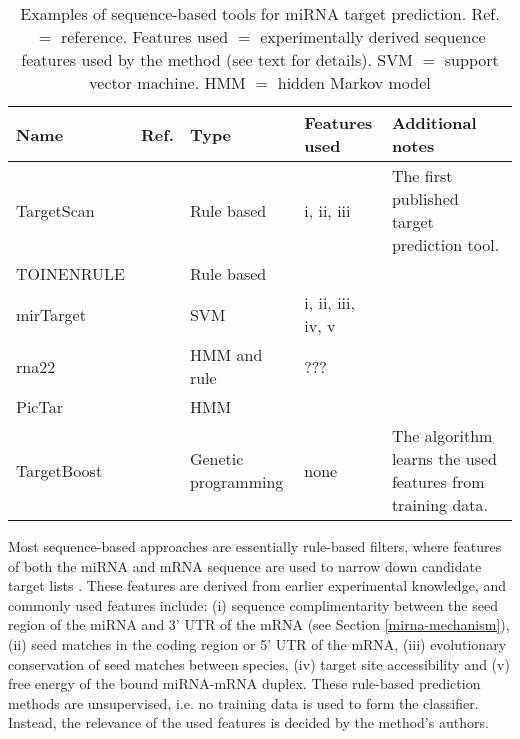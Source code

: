 \begin{table}
  \caption{Examples of sequence-based tools for miRNA target prediction.
  Ref. $=$ reference. Features used $=$ experimentally derived sequence
  features used by the method (see text for details). SVM $=$ support
  vector machine. HMM $=$ hidden Markov model}
  \label{table:sequence-methods}
  \centering
  \begingroup\small
  \begin{tabular}{ llllp{4cm} }
    \\[-1ex] \hline\hline
    \textbf{Name} & \textbf{Ref.} & \textbf{Type} & \textbf{Features used} & \textbf{Additional notes} \\
    \hline
    TargetScan  & \citep{Agarwal2015} & Rule based & i, ii, iii & The first published target prediction tool. \\
    TOINENRULE  & \citep{} & Rule based &  &  \\
    mirTarget   & \citep{} & SVM & i, ii, iii, iv, v &  \\
    rna22       & \citep{} & HMM and rule & ??? &  \\
    PicTar      & \citep{} & HMM &  &  \\
    TargetBoost & \citep{} & Genetic programming & none & The algorithm learns the used features from training data. \\
    \hline\hline
    \end{tabular}
    \endgroup
\end{table}

Most sequence-based approaches are essentially rule-based filters, where
features of both the miRNA and mRNA sequence are used to narrow down candidate
target lists \citep{Yeu2009}. These features are derived from earlier
experimental knowledge, and commonly used features include: (i) sequence
complimentarity between the seed region of the miRNA and 3' UTR of the mRNA
(see Section \ref{mirna-mechanism}), (ii) seed matches in the coding region or
5' UTR of the mRNA, (iii) evolutionary conservation of seed matches between
species, (iv) target site accessibility and (v) free energy of the bound
miRNA-mRNA duplex. These rule-based prediction methods are unsupervised, i.e.
no training data is used to form the classifier. Instead, the relevance of the
used features is decided by the method's authors.


